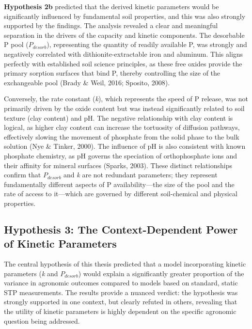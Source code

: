\documentclass[
  a4paper,
]{article}
\begin{document}
\textbf{Hypothesis 2b} predicted that the derived kinetic parameters
would be significantly influenced by fundamental soil properties, and
this was also strongly supported by the findings. The analysis revealed
a clear and meaningful separation in the drivers of the capacity and
kinetic components. The desorbable P pool (\(P_{desorb}\)), representing
the quantity of readily available P, was strongly and negatively
correlated with dithionite-extractable iron and aluminum. This aligns
perfectly with established soil science principles, as these free oxides
provide the primary sorption surfaces that bind P, thereby controlling
the size of the exchangeable pool (Brady \& Weil, 2016; Sposito, 2008).

Conversely, the rate constant (\emph{k}), which represents the speed of
P release, was not primarily driven by the oxide content but was instead
significantly related to soil texture (clay content) and pH. The
negative relationship with clay content is logical, as higher clay
content can increase the tortuosity of diffusion pathways, effectively
slowing the movement of phosphate from the solid phase to the bulk
solution (Nye \& Tinker, 2000). The influence of pH is also consistent
with known phosphate chemistry, as pH governs the speciation of
orthophosphate ions and their affinity for mineral surfaces (Sparks,
2003). These distinct relationships confirm that \(P_{desorb}\) and
\emph{k} are not redundant parameters; they represent fundamentally
different aspects of P availability---the size of the pool and the rate
of access to it---which are governed by different soil-chemical and
physical properties.

\subsection{Hypothesis 3: The Context-Dependent Power of Kinetic
Parameters}\label{hypothesis-3-the-context-dependent-power-of-kinetic-parameters}

The central hypothesis of this thesis predicted that a model
incorporating kinetic parameters (\emph{k} and \(P_{desorb}\)) would
explain a significantly greater proportion of the variance in agronomic
outcomes compared to models based on standard, static STP measurements.
The results provide a nuanced verdict: the hypothesis was strongly
supported in one context, but clearly refuted in others, revealing that
the utility of kinetic parameters is highly dependent on the specific
agronomic question being addressed.
\end{document}
